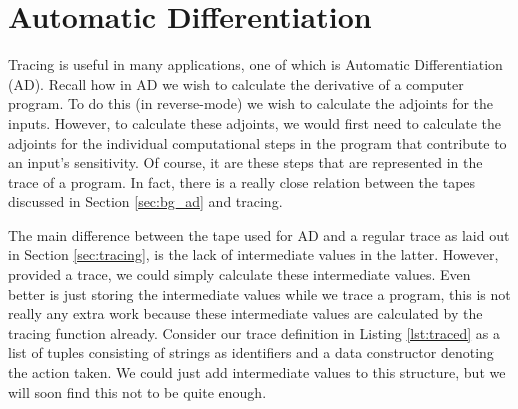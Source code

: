 \clearpage
\section{Automatic Differentiation} \label{sec:ad}
    Tracing is useful in many applications, one of which is Automatic Differentiation (AD).
    Recall how in AD we wish to calculate the derivative of a computer program.
    To do this (in reverse-mode) we wish to calculate the adjoints for the inputs.
    However, to calculate these adjoints, we would first need to calculate the adjoints for the individual computational steps in the program that contribute to an input's sensitivity.
    Of course, it are these steps that are represented in the trace of a program.
    In fact, there is a really close relation between the tapes discussed in Section \ref{sec:bg_ad} and tracing.

    The main difference between the tape used for AD and a regular trace as laid out in Section \ref{sec:tracing}, is the lack of intermediate values in the latter.
    However, provided a trace, we could simply calculate these intermediate values.
    Even better is just storing the intermediate values while we trace a program, this is not really any extra work because these intermediate values are calculated by the tracing function already.
    Consider our trace definition in Listing \ref{lst:traced} as a list of tuples consisting of strings as identifiers and a data constructor denoting the action taken.
    We could just add intermediate values to this structure, but we will soon find this not to be quite enough.
    
